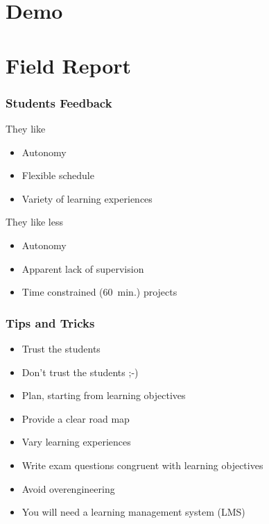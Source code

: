 \section{Demo}

\section{Field Report}

\begin{frame}
  \frametitle{Students Feedback}

  \begin{minipage}{0.48\textwidth}
    They like
    \begin{itemize}
    \item Autonomy
    \item Flexible schedule
    \item Variety of learning experiences
    \end{itemize}
  \end{minipage}
  \hfill
  \begin{minipage}{0.48\textwidth}
    They like less
    \begin{itemize}
    \item Autonomy
    \item Apparent lack of supervision
    \item Time constrained (60~min.) projects
    \end{itemize}
  \end{minipage}
\end{frame}

\begin{frame}
  \frametitle{Tips and Tricks}

  \begin{itemize}[<+->]
  \item Trust the students
  \item Don't trust the students ;-)
  \end{itemize}

  \begin{itemize}[<3->]
  \item Plan, starting from learning objectives
  \item Provide a clear road map
  \item Vary learning experiences
  \item Write exam questions congruent with learning objectives
  \item Avoid overengineering
  \end{itemize}

  \begin{itemize}[<4->]
  \item You will need a learning management system (LMS)
  \end{itemize}
\end{frame}

